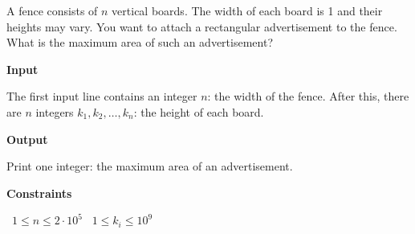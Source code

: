 A fence consists of $n$ vertical boards. The width of each board is 1 and their heights may vary.
You want to attach a rectangular advertisement to the fence. What is the maximum area of such an advertisement?

\vspace{0.3cm}\noindent\textbf{Input}

The first input line contains an integer $n$: the width of the fence.
After this, there are $n$ integers $k_1,k_2,\ldots,k_n$: the height of each board.

\vspace{0.3cm}\noindent\textbf{Output}

Print one integer: the maximum area of an advertisement.

\vspace{0.3cm}\noindent\textbf{Constraints}

\textbullet\ $1 \le n \le 2 \cdot 10^5$
\textbullet\ $1 \le k_i \le 10^9$